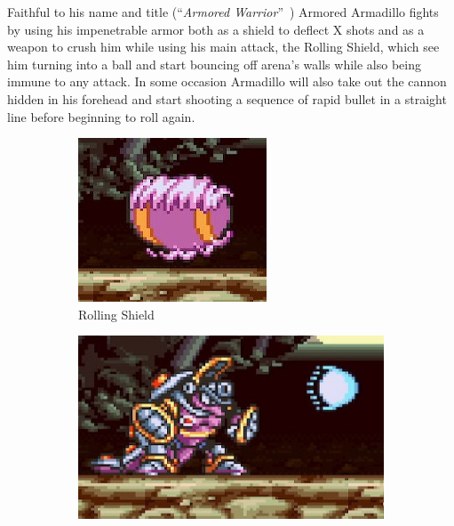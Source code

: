 Faithful to his name and title (``\textit{Armored Warrior}''~\cite{book:MMX_Complete_art}) Armored Armadillo fights by using his impenetrable armor both as a shield to deflect X shots and as a weapon to crush him while using his main attack, the Rolling Shield, which see him turning into a ball and start bouncing off arena's walls while also being immune to any attack. In some occasion Armadillo will also take out the cannon hidden in his forehead and start shooting a sequence of rapid bullet in a straight line before beginning to roll again. 
\begin{figure}[htp]
	\centering
	\begin{subfigure}[t]{0.3\textwidth}
		\centering
		\includegraphics[width=\linewidth]{figures/X1/Armored_armadillo/Armadillo_rolling.jpg}
		\caption{Rolling Shield}
	\end{subfigure}
	\begin{subfigure}[t]{0.4\textwidth}
		\centering
		\includegraphics[width=\linewidth]{figures/X1/Armored_armadillo/Armadillo_cannon.jpg}

\end{subfigure}
\end{figure}

